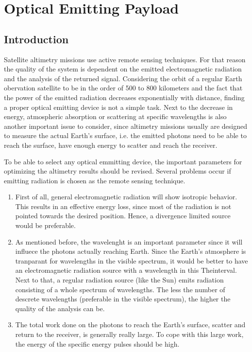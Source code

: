 \section{Optical Emitting Payload}
	\label{blDOLSR}
		\subsection{Introduction}
Satellite altimetry missions use active remote sensing techniques. For that reason the quality of the system is dependent on the emitted electromagnetic radiation and the analysis of the returned signal. Considering the orbit of a regular Earth obervation satellite to be in the order of 500 to 800 kilometers and the fact that the power of the emitted radiation decreases exponentially with distance, finding a proper optical emitting device is not a simple task. Next to the decrease in energy, atmospheric absorption or scattering at specific wavelengths is also another important issue to consider, since altimetry missions usually are designed to measure the actual Earth's surface, i.e. the emitted photons need to be able to reach the surface, have enough energy to scatter and reach the receiver.

To be able to select any optical emmitting device, the important parameters for optimizing the altimetry results should be revised. Several problems occur if emitting radiation is chosen as the remote sensing technique. 
\begin{enumerate}
	\item First of all, general electromagnetic radiation will show isotropic behavior. This results in an effective energy loss, since most of the radiation is not pointed towards the desired position. Hence, a divergence limited source would be preferable.
	\item As mentioned before, the wavelenght is an important parameter since it will influece the photons actually reaching Earth. Since the Earth's atmosphere is tranparant for wavelengths in the visible spectrum, it would be better to have an electromagnetic radiation source with a wavelength in this Theinterval. Next to that, a regular radiation source (like the Sun) emits radiation consisting of a whole spectrum of wavelengths. The less the number of descrete wavelengths (preferable in the visible spectrum), the higher the quality of the analysis can be.
	\item The total work done on the photons to reach the Earth's surface, scatter and return to the receiver, is generally really large. To cope with this large work, the energy of the specific energy pulses should be high.  
\end{enumerate}


